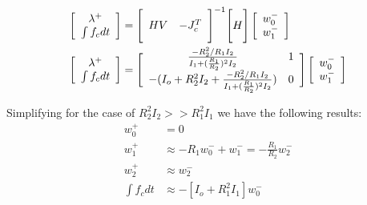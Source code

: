 \begin{align}
\left[ \begin{array}{c} \lambda^+ \\ \int{f_c dt} \end{array} \right] &= \Bigg[ \begin{array}{c c} HV & -J_c^T \end{array} \Bigg]^{-1} \Bigg[ H \Bigg] \left[ \begin{array}{c} w_0^- \\ w_1^- \end{array} \right] \\
\left[ \begin{array}{c} \lambda^+ \\ \int{f_c dt} \end{array} \right] &= \Bigg[ \begin{array}{c c} 
\frac{-R_2^2/R_1 I_2}{I_1+(\frac{R_1}{R_2})^2 I_2} & 1 \\
- (I_o + R_2^2 I_2+\frac{-R_2^2/R_1 I_2}{I_1+(\frac{R_1}{R_2})^2 I_2}) & 0 
\end{array} \Bigg] \left[ \begin{array}{c} w_0^- \\ w_1^- \end{array} \right]
\label{eq:dsdm_impact_sol}
\end{align}
%

Simplifying for the case of $R_2^2 I_2 >> R_1^2 I_1 $ we have the following results:
%
\begin{align}
w_0^+            &= 0 \\
w_1^+            &\approx - R_1 w_0^- + w_1^-  = - \frac{R_1}{R_2} w_2^- \\
w_2^+            &\approx  w_2^- \\
\int{f_c dt}     &\approx -[I_o + R_1^2 I_1] w_0^-
\label{eq:dsdm_impact_res}
\end{align}
%

